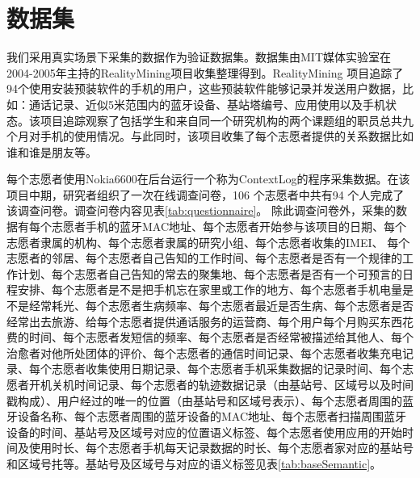 \section{数据集}
\label{sec:section5-1}
我们采用真实场景下采集的数据作为验证数据集。数据集由MIT媒体实验室在2004-2005年主持的RealityMining项目收集整理得到。RealityMining 项目追踪了94个使用安装预装软件的手机的用户，这些预装软件能够记录并发送用户数据，比如：通话记录、近似5米范围内的蓝牙设备、基站塔编号、应用使用以及手机状态。该项目追踪观察了包括学生和来自同一个研究机构的两个课题组的职员总共九个月对手机的使用情况。与此同时，该项目收集了每个志愿者提供的关系数据比如谁和谁是朋友等。
\par 每个志愿者使用Nokia6600在后台运行一个称为ContextLog的程序采集数据。在该项目中期，研究者组织了一次在线调查问卷，106 个志愿者中共有94 个人完成了该调查问卷。调查问卷内容见表\ref{tab:questionnaire}。 除此调查问卷外，采集的数据有每个志愿者手机的蓝牙MAC地址、每个志愿者开始参与该项目的日期、每个志愿者隶属的机构、每个志愿者隶属的研究小组、每个志愿者收集的IMEI、 每个志愿者的邻居、每个志愿者自己告知的工作时间、每个志愿者是否有一个规律的工作计划、每个志愿者自己告知的常去的聚集地、每个志愿者是否有一个可预言的日程安排、每个志愿者是不是把手机忘在家里或工作的地方、每个志愿者手机电量是不是经常耗光、每个志愿者生病频率、每个志愿者最近是否生病、每个志愿者是否经常出去旅游、给每个志愿者提供通话服务的运营商、每个用户每个月购买东西花费的时间、每个志愿者发短信的频率、每个志愿者是否经常被描述给其他人、每个治愈者对他所处团体的评价、每个志愿者的通信时间记录、每个志愿者收集充电记录、每个志愿者收集使用日期记录、每个志愿者手机采集数据的记录时间、每个志愿者开机关机时间记录、每个志愿者的轨迹数据记录（由基站号、区域号以及时间戳构成）、用户经过的唯一的位置（由基站号和区域号表示）、每个志愿者周围的蓝牙设备名称、每个志愿者周围的蓝牙设备的MAC地址、每个志愿者扫描周围蓝牙设备的时间、基站号及区域号对应的位置语义标签、每个志愿者使用应用的开始时间及使用时长、每个志愿者手机每天记录数据的时长、每个志愿者家对应的基站号和区域号扥等。基站号及区域号与对应的语义标签见表\ref{tab:baseSemantic}。
